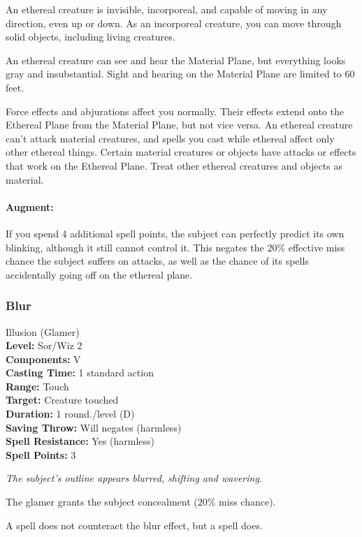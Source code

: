 An ethereal creature is invisible, incorporeal, 
and capable of moving in any direction, even up or down. 
As an incorporeal creature, you can move through solid objects, including living creatures.

An ethereal creature can see and hear the Material Plane, 
but everything looks gray and insubstantial. 
Sight and hearing on the Material Plane are limited to 60 feet.

Force effects and abjurations affect you normally. 
Their effects extend onto the Ethereal Plane from the Material Plane, but not vice versa. 
An ethereal creature can't attack material creatures, 
and spells you cast while ethereal affect only other ethereal things. 
Certain material creatures or objects have attacks or effects that work on the Ethereal Plane. 
Treat other ethereal creatures and objects as material.

\paragraph{Augment:} If you spend 4 additional spell points, the subject can perfectly predict its own blinking,
although it still cannot control it. This negates the 20\% effective miss chance the subject suffers on attacks, as
well as the chance of its spells accidentally going off on the ethereal plane.

\subsubsection{Blur}
\label{Spell:Blur}
Illusion (Glamer)
\\ \textbf{Level:} Sor/Wiz 2
\\ \textbf{Components:} V
\\ \textbf{Casting Time:} 1 standard action
\\ \textbf{Range:} Touch
\\ \textbf{Target:} Creature touched
\\ \textbf{Duration:} 1 round./level (D)
\\ \textbf{Saving Throw:} Will negates (harmless)
\\ \textbf{Spell Resistance:} Yes (harmless)
\\ \textbf{Spell Points:} 3

\emph{The subject's outline appears blurred, shifting and wavering.}

The glamer grants the subject concealment (20\% miss chance).

A  spell does not counteract the blur effect, but a  spell does.

